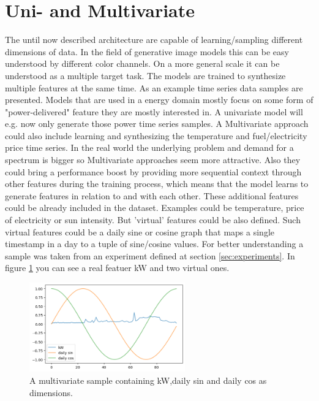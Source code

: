 \section{Uni- and Multivariate}
\label{sec: uni and multi}
The until now described architecture are capable of learning/sampling different dimensions of data.
In the field of generative image models this can be easy understood by different color channels. On a more general scale it can be
understood as a multiple target task. The models are trained to synthesize multiple features at the same time. As an example time series data samples are presented. Models that are used in a energy domain mostly focus on some form of "power-delivered" feature they are mostly 
interested in. A univariate model will e.g. now only generate those power time series samples. A Multivariate approach could also 
include learning and synthesizing the temperature and fuel/electricity price time series. In the real world the underlying problem and demand for
a spectrum is bigger so Multivariate approaches seem more attractive. Also they could bring a performance boost by providing more sequential 
context through other features during the training process, which means that the model learns to generate features in relation to and with each other.
These additional features could be already included in the dataset. Examples could be temperature, price of electricity or sun intensity.
But 'virtual' features could be also defined. Such virtual features could be a daily sine or cosine graph that maps a single timestamp in a day to a tuple of sine/cosine values.
For better understanding a sample was taken from an experiment defined at section \ref{sec:experiments}. In figure \ref{fig:multivar example} you can see a real featuer kW and two virtual ones.
\begin{figure}[h!]
    \centering
    \includegraphics[width=0.6\textwidth]{images/multivar_example.png}
    \caption{A multivariate sample containing kW,daily sin and daily cos as dimensions.}
    \label{fig:multivar example}
\end{figure}
